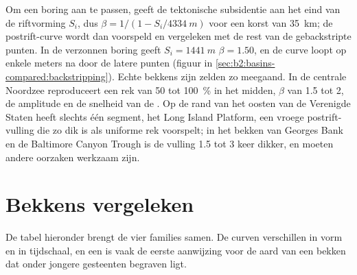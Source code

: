 Om een boring aan te passen, geeft de tektonische subsidentie aan het eind van de riftvorming $S_i$, dus
$\beta = 1/(1 - S_i/\qty{4334}{m})$ voor een korst van \qty{35}{km}; de postrift-curve wordt dan voorspeld
en vergeleken met de rest van de gebackstripte punten. In de verzonnen boring geeft $S_i = \qty{1441}{m}$
$\beta = 1.50$, en de curve loopt op enkele meters na door de latere punten (figuur in
\cref{sec:b2:basins-compared:backstripping}). Echte bekkens zijn zelden zo meegaand. In de
centrale Noordzee reproduceert een rek van 50 tot \qty{100}{\percent} in het midden, $\beta$ van 1.5 tot 2,
de amplitude en de snelheid van de . Op de rand van het oosten van de Verenigde
Staten heeft slechts één segment, het Long Island Platform, een vroege postrift-vulling die zo dik is
als uniforme rek voorspelt; in het bekken van Georges Bank en de Baltimore Canyon Trough is de
vulling 1.5 tot 3 keer dikker, en moeten andere oorzaken werkzaam zijn.

\section{Bekkens vergeleken}\label{sec:b2:basins-compared:compared}

De tabel hieronder brengt de vier families samen. De curven verschillen in vorm en in tijdschaal, en een
 is vaak de eerste aanwijzing voor de aard van een bekken dat onder jongere gesteenten begraven ligt.

